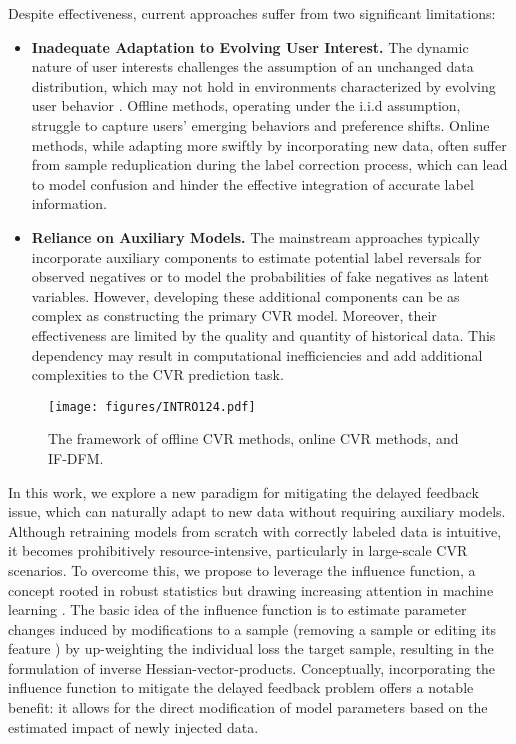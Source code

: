 Despite effectiveness, current approaches suffer from two significant limitations:
\begin{itemize}[leftmargin=*]
    \item \textbf{Inadequate Adaptation to Evolving User Interest.} {The dynamic nature of user interests challenges the assumption of an unchanged data distribution, which may not hold in environments characterized by evolving user behavior \cite{dai2023dually}.} Offline methods, operating under the i.i.d assumption, struggle to capture users' emerging behaviors and preference shifts. {Online methods, while adapting more swiftly by incorporating new data, often suffer from sample reduplication during the label correction process, which can lead to model confusion and hinder the effective integration of accurate label information.}
    \item \textbf{Reliance on Auxiliary Models.} The mainstream approaches typically incorporate auxiliary components to estimate potential label reversals for observed negatives or to model the probabilities of fake negatives as latent variables. However, developing these additional components can be as complex as constructing the primary CVR model. Moreover, their effectiveness are limited by the quality and quantity of historical data. This dependency may result in computational inefficiencies and add additional complexities to the CVR prediction task.
\end{itemize}

\begin{figure}[t]
    \centering
\texttt{[image: figures/INTRO124.pdf]}
    \vspace{-10pt}
    \caption{The framework of offline CVR methods, online CVR methods, and IF-DFM.}
    \label{fig:compare}
    \vspace{-15pt}
\end{figure}

In this work, we explore a new paradigm for mitigating the delayed feedback issue, which can naturally adapt to new data without requiring auxiliary models.
Although retraining models from scratch with correctly labeled data is intuitive, it becomes prohibitively resource-intensive, particularly in large-scale CVR scenarios.
To overcome this, we propose to leverage the influence function, a concept rooted in robust statistics but drawing increasing attention in machine learning \cite{koh2017understanding}.
The basic idea of the influence function is to estimate parameter changes induced by modifications to a sample (\eg removing a sample \cite{zhang2023recommendation} or editing its feature \cite{wu2023gif}) by up-weighting the individual loss \wrt the target sample, resulting in the formulation of inverse Hessian-vector-products.
Conceptually, incorporating the influence function to mitigate the delayed feedback problem offers a notable benefit:
it allows for the direct modification of model parameters based on the estimated impact of newly injected data.

